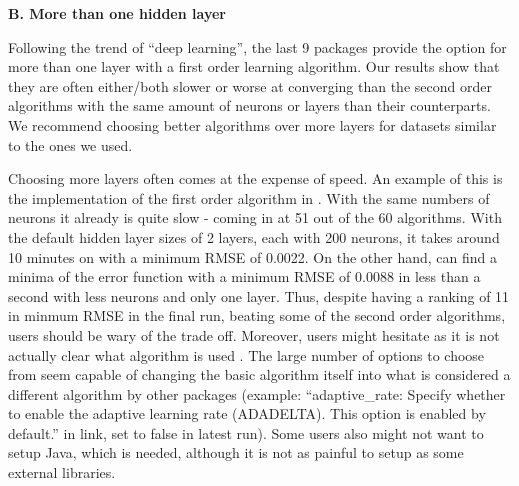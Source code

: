 \textbf{B. More than one hidden layer}

Following the trend of ``deep learning'', the last 9 packages provide
the option for more than one layer with a first order learning
algorithm. Our results show that they are often either/both slower or
worse at converging than the second order algorithms with the same
amount of neurons or layers than their counterparts. We recommend
choosing better algorithms over more layers for datasets similar to the
ones we used.

Choosing more layers often comes at the expense of speed. An example of
this is the implementation of the first order algorithm in 
\citep{R-h2o}. With the same numbers of neurons it already is quite slow
- coming in at 51 out of the 60 algorithms. With the default hidden
layer sizes of 2 layers, each with 200 neurons, it takes around 10
minutes on  with a minimum RMSE of 0.0022. On the other
hand,  can find a minima of the error function with a
minimum RMSE of 0.0088 in less than a second with less neurons and only
one layer. Thus, despite having a ranking of 11 in minmum RMSE in the
final run, beating some of the second order algorithms, users should be
wary of the trade off. Moreover, users might hesitate as it is not
actually clear what algorithm is used . The large number of options to
choose from seem capable of changing the basic algorithm itself into
what is considered a different algorithm by other packages (example:
``adaptive\_rate: Specify whether to enable the adaptive learning rate
(ADADELTA). This option is enabled by default.'' in link, set to false
in latest run). Some users also might not want to setup Java, which is
needed, although it is not as painful to setup as some external
libraries.

